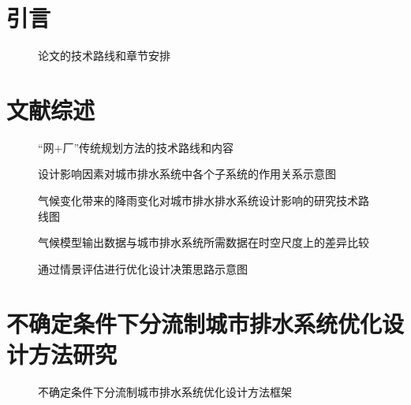 \documentclass[degree=doctor]{sysuthesis}
\begin{document}
\START


\frontmatter
\setcounter{page}{3}
\showoutput
\listoffigures
\clearpage
\OMIT


\mainmatter
\chapter{引言}

\clearpage
\setcounter{page}{10}
\begin{figure}
  \centering
  \caption{论文的技术路线和章节安排}
\end{figure}


\chapter{文献综述}

\clearpage
\setcounter{page}{19}
\begin{figure}
  \centering
  \caption{“网+厂”传统规划方法的技术路线和内容}
\end{figure}

\clearpage
\setcounter{page}{28}
\begin{figure}
  \centering
  \caption{设计影响因素对城市排水系统中各个子系统的作用关系示意图}
\end{figure}

\clearpage
\setcounter{page}{29}
\begin{figure}
  \centering
  \caption{气候变化带来的降雨变化对城市排水排水系统设计影响的研究技术路线图}
\end{figure}

\clearpage
\setcounter{page}{30}
\begin{figure}
  \centering
  \caption{气候模型输出数据与城市排水系统所需数据在时空尺度上的差异比较}
\end{figure}

\clearpage
\setcounter{page}{33}
\begin{figure}
  \centering
  \caption{通过情景评估进行优化设计决策思路示意图}
\end{figure}


\chapter{不确定条件下分流制城市排水系统优化设计方法研究}

\clearpage
\setcounter{page}{42}
\begin{figure}
  \centering
  \caption{不确定条件下分流制城市排水系统优化设计方法框架}
\end{figure}
\end{document}
